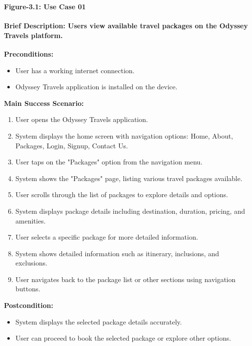 \documentclass{scrreprt}
\begin{document}
\begin{center}
    \parbox{0.8\textwidth}{ 
        \centering
        \textbf{Figure-3.1: Use Case 01}
    }
\end{center}

\paragraph {\textnormal{Brief Description: 
Users view available travel packages on the Odyssey Travels platform.}}

\textbf{Preconditions:}
\begin{itemize}
    \item User has a working internet connection.
    \item Odyssey Travels application is installed on the device.
\end{itemize}

\textbf{Main Success Scenario:}
\begin{enumerate}
    \item User opens the Odyssey Travels application.
    \item System displays the home screen with navigation options: Home, About, Packages, Login, Signup, Contact Us.
    \item User taps on the "Packages" option from the navigation menu.
    \item System shows the "Packages" page, listing various travel packages available.
    \item User scrolls through the list of packages to explore details and options.
    \item System displays package details including destination, duration, pricing, and amenities.
    \item User selects a specific package for more detailed information.
    \item System shows detailed information such as itinerary, inclusions, and exclusions.
    \item User navigates back to the package list or other sections using navigation buttons.
\end{enumerate}

\textbf{Postcondition:}
\begin{itemize}
    \item System displays the selected package details accurately.
    \item User can proceed to book the selected package or explore other options.
\end{itemize}
\end{document}
